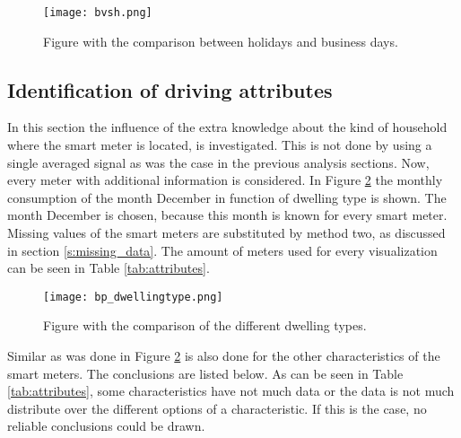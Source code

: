 \begin{figure}[h!]
	\centering
	\texttt{[image: bvsh.png]}
	\caption{Figure with the comparison between holidays and business days.}
	\label{fig:bvsh}
\end{figure}



\subsection{Identification of driving attributes}
In this section the influence of the extra knowledge about the kind of household where the smart meter is located, is investigated. This is not done by using a single averaged signal as was the case in the previous analysis sections. Now, every meter with additional information is considered. In Figure \ref{fig:bp_dwellingtype} the monthly consumption of the month December in function of dwelling type is shown. The month December is chosen, because this month is known for every smart meter. Missing values of the smart meters are substituted by method two, as discussed in section \ref{s:missing_data}. The amount of meters used for every visualization can be seen in Table \ref{tab:attributes}.


\begin{figure}[h!]
	\centering
	\texttt{[image: bp\_dwellingtype.png]}
	\caption{Figure with the comparison of the different dwelling types.}
	\label{fig:bp_dwellingtype}
\end{figure}





Similar as was done in Figure \ref{fig:bp_dwellingtype} is also done for the other characteristics of the smart meters. The conclusions are listed below. As can be seen in Table \ref{tab:attributes}, some characteristics have not much data or the data is not much distribute over the different options of a characteristic. If this is the case, no reliable conclusions could be drawn.

